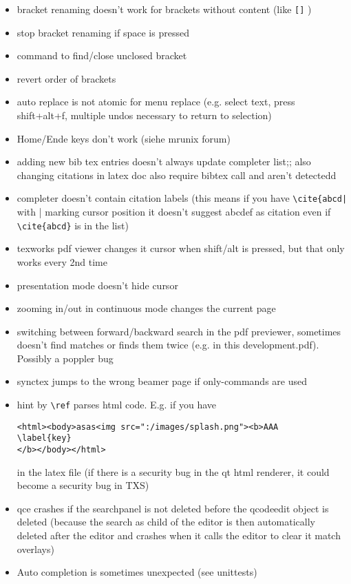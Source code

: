 \documentclass[10pt,a4paper,landscape]{report}
\begin{document}
\begin{itemize}
\item bracket renaming doesn't work for brackets without content (like \verb+[]+ )
\item stop bracket renaming if space is pressed
\item command to find/close unclosed bracket
\item revert order of brackets
\item auto replace is not atomic for menu replace (e.g. select text, press shift+alt+f, multiple undos necessary to return to selection)
\item Home/Ende keys don't work (siehe mrunix forum)
\item adding new bib tex entries doesn't always update completer list;; also changing citations in latex doc also require bibtex call and aren't detectedd
\item completer doesn't contain citation labels (this means if you have \verb+\cite{abcd|+ with | marking cursor position it doesn't suggest abcdef as citation even if \verb+\cite{abcd}+ is in the list)
\item texworks pdf viewer changes it cursor when shift/alt is pressed, but that only works every 2nd time
\item presentation mode doesn't hide cursor
\item zooming in/out in continuous mode changes the current page
\item switching between forward/backward search in the pdf previewer, sometimes doesn't find matches or finds them twice (e.g. in this development.pdf). Possibly a poppler bug
\item synctex jumps to the wrong beamer page if only-commands are used
\item hint by \verb+\ref+ parses html code. E.g. if you have \begin{verbatim}
<html><body>asas<img src=":/images/splash.png"><b>AAA
\label{key}
</b></body></html>
\end{verbatim} in the latex file (if there is a security bug in the qt html renderer, it could become a security bug in TXS)
	\item  qce crashes if the searchpanel is not deleted before the qcodeedit object is deleted (because the search as child of the editor is then automatically deleted after the editor and crashes when it calls the editor to clear it match overlays)
	\item  Auto completion is sometimes unexpected (see unittests)
\end{itemize} 
\end{document}
